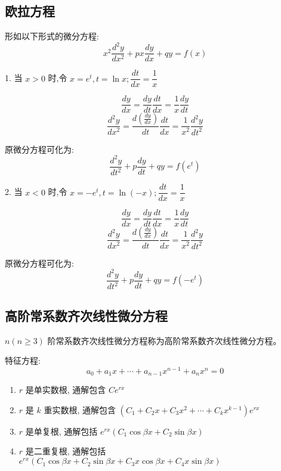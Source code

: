 \subsection{欧拉方程}
\begin{definition}[欧拉方程]\label{def: 欧拉方程}
	形如以下形式的微分方程:
	$$x^{2}\dfrac{d^{2}y}{dx^2}+px\dfrac{dy}{dx}+qy=f(x)$$

	1. 当 $x>0$ 时,令 $x=e^t,t=\ln x;\dfrac{dt}{dx}=\dfrac{1}{x}$

	$$\dfrac{dy}{dx}=\dfrac{dy}{dt}\dfrac{dt}{dx}=\dfrac{1}{x}\dfrac{dy}{dt}$$
	$$\dfrac{d^{2}y}{dx^2}=\dfrac{d(\frac{dy}{dx})}{dt}\dfrac{dt}{dx}=\dfrac{1}{x^2}\dfrac{d^{2}y}{dt^2}$$

	原微分方程可化为:
	$$\dfrac{d^{2}y}{dt^2}+p\dfrac{dy}{dt}+qy=f(e^t)$$

	2. 当 $x<0$ 时,令 $x=-e^t,t=\ln(-x);\dfrac{dt}{dx}=\dfrac{1}{x}$

	$$\dfrac{dy}{dx}=\dfrac{dy}{dt}\dfrac{dt}{dx}=\dfrac{1}{x}\dfrac{dy}{dt}$$
	$$\dfrac{d^{2}y}{dx^2}=\dfrac{d(\frac{dy}{dx})}{dt}\dfrac{dt}{dx}=\dfrac{1}{x^2}\dfrac{d^{2}y}{dt^2}$$

	原微分方程可化为:
	$$\dfrac{d^{2}y}{dt^2}+p\dfrac{dy}{dt}+qy=f(-e^t)$$
\end{definition}
\subsection{高阶常系数齐次线性微分方程}
\begin{definition}[高阶常系数齐次线性微分方程]
	$n(n\geq 3)$ 阶常系数齐次线性微分方程称为高阶常系数齐次线性微分方程。
\end{definition}

\begin{proposition}[$n$ 阶常系数线性微分方程解]
	特征方程:
	$$a_{0} + a_{1}x + \cdots + a_{n-1}x^{n-1} + a_{n}x^{n} = 0$$

	\begin{enumerate}
		\item $r$ 是单实数根, 通解包含 $Ce^{rx}$
		\item $r$ 是 $k$ 重实数根, 通解包含 $(C_{1} + C_{2}x + C_{3}x^{2} + \cdots + C_{k}x^{k-1})e^{rx}$
		\item $r$ 是单复根, 通解包括 $e^{rx}(C_{1}\cos \beta x+C_{2}\sin \beta x)$
		\item $r$ 是二重复根, 通解包括 $e^{rx}(C_{1}\cos \beta x+C_{2}\sin \beta x+C_{3}x\cos \beta x+C_{4}x\sin \beta x)$
	\end{enumerate}
\end{proposition}

